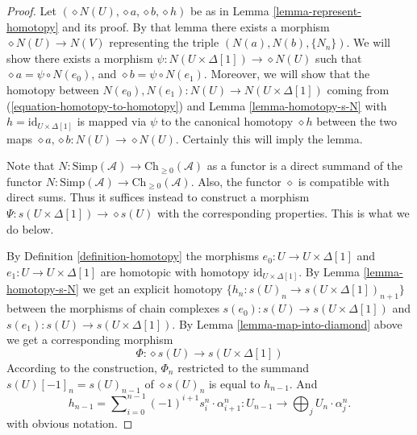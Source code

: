 \begin{proof}
Let $(\diamond N(U), \diamond a, \diamond b, \diamond h)$
be as in Lemma \ref{lemma-represent-homotopy} and its proof. By that lemma
there exists a morphism $\diamond N(U) \to N(V)$ representing
the triple $(N(a), N(b), \{N_n\})$. We will show
there exists a morphism
$\psi : N(U \times \Delta[1]) \to \diamond{N(U)}$
such that $\diamond a = \psi \circ N(e_0)$, and
$\diamond b = \psi \circ N(e_1)$. Moreover, we will
show that the homotopy between $N(e_0), N(e_1) :
N(U) \to N(U \times \Delta[1])$ coming from
(\ref{equation-homotopy-to-homotopy}) and
Lemma \ref{lemma-homotopy-s-N} with
$h = \text{id}_{U \times \Delta[1]}$ is mapped via
$\psi$ to the canonical homotopy $\diamond h$ between the two
maps $\diamond a, \diamond b : N(U) \to \diamond{N(U)}$. Certainly this
will imply the lemma.

\medskip\noindent
Note that $N : \text{Simp}(\mathcal{A}) \to \text{Ch}_{\geq 0}(\mathcal{A})$
as a functor is a direct summand of the functor
$N : \text{Simp}(\mathcal{A}) \to \text{Ch}_{\geq 0}(\mathcal{A})$.
Also, the functor $\diamond$ is compatible with direct sums.
Thus it suffices instead to construct a morphism
$\Psi : s(U \times \Delta[1]) \to \diamond{s(U)}$ with the
corresponding properties. This is what we do below.

\medskip\noindent
By Definition \ref{definition-homotopy}
the morphisms $e_0 : U \to U \times \Delta[1]$
and $e_1 : U \to U \times \Delta[1]$ are homotopic
with homotopy $\text{id}_{U \times \Delta[1]}$.
By Lemma \ref{lemma-homotopy-s-N}
we get an explicit homotopy
$\{h_n : s(U)_n \to s(U \times \Delta[1])_{n + 1}\}$
between the morphisms
of chain complexes $s(e_0) : s(U) \to s(U \times \Delta[1])$
and $s(e_1) : s(U) \to s(U \times \Delta[1])$. By
Lemma \ref{lemma-map-into-diamond} above we get a corresponding morphism
$$
\Phi : \diamond{s(U)} \to s(U \times \Delta[1])
$$
According to the construction, $\Phi_n$ restricted to the summand
$s(U)[-1]_n = s(U)_{n - 1}$ of $\diamond{s(U)}_n$
is equal to $h_{n - 1}$. And
$$
h_{n - 1} = \sum\nolimits_{i = 0}^{n - 1}
(-1)^{i + 1} s^n_i \cdot \alpha^n_{i + 1} :
U_{n - 1} \to \bigoplus\nolimits_j U_n \cdot \alpha^n_j.
$$
with obvious notation.


\end{proof}
